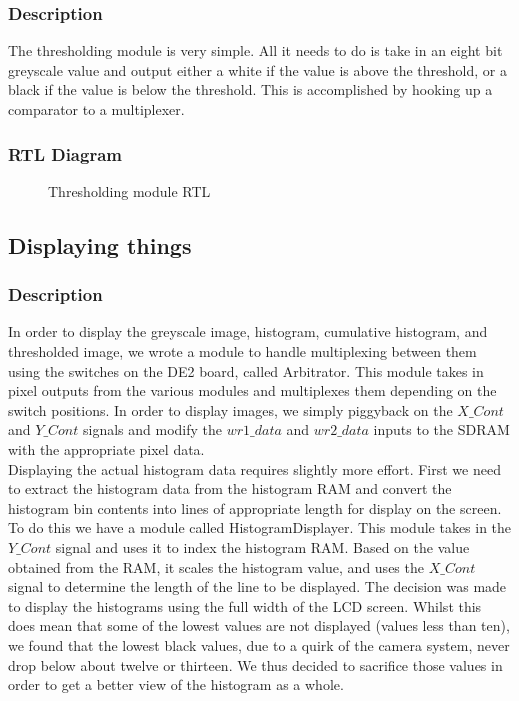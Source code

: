 \documentclass[12pt]{article}
\begin{document}
  \subsubsection{Description}
  The thresholding module is very simple. All it needs to do is take in an eight bit greyscale value and output either a white if the value is above the threshold, or a black if the value is below the threshold. This is accomplished by hooking up a comparator to a multiplexer.
  
  \subsubsection{RTL Diagram}
  \begin{figure}[H]
    \caption{Thresholding module RTL}
    \label{fig:thresholder_rtl}
  \end{figure}
  
  
  \subsection{Displaying things}
  \subsubsection{Description}
  In order to display the greyscale image, histogram, cumulative histogram, and thresholded image, we wrote a module to handle multiplexing between them using the switches on the DE2 board, called Arbitrator. This module takes in pixel outputs from the various modules and multiplexes them depending on the switch positions. In order to display images, we simply piggyback on the \(X\_Cont\) and \(Y\_Cont\) signals and modify the \(wr1\_data\) and \(wr2\_data\) inputs to the SDRAM with the appropriate pixel data. \\
      
  Displaying the actual histogram data requires slightly more effort. First we need to extract the histogram data from the histogram RAM and convert the histogram bin contents into lines of appropriate length for display on the screen. To do this we have a module called HistogramDisplayer. This module takes in the \(Y\_Cont\) signal and uses it to index the histogram RAM. Based on the value obtained from the RAM, it scales the histogram value, and uses the \(X\_Cont\) signal to determine the length of the line to be displayed. The decision was made to display the histograms using the full width of the LCD screen. Whilst this does mean that some of the lowest values are not displayed (values less than ten), we found that the lowest black values, due to a quirk of the camera system, never drop below about twelve or thirteen. We thus decided to sacrifice those values in order to get a better view of the histogram as a whole.
  
\end{document}
